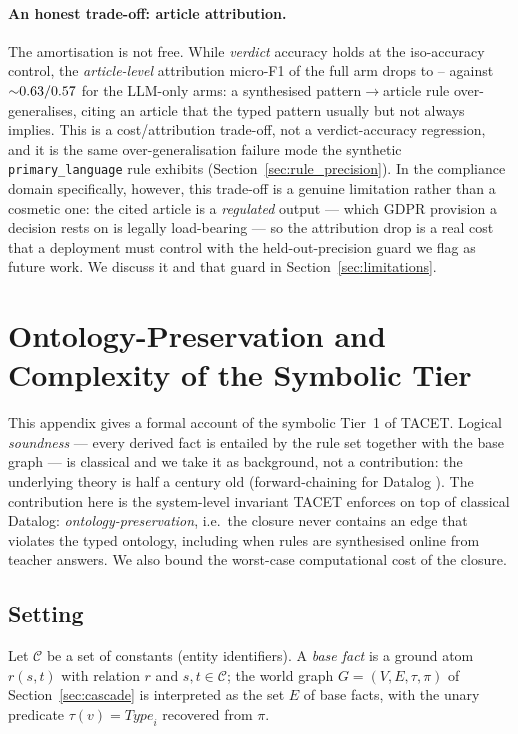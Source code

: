 \documentclass[11pt]{article}
\theoremstyle{plain}
\begin{document}
\paragraph{An honest trade-off: article attribution.} The amortisation is not
free. While \emph{verdict} accuracy holds at the iso-accuracy control, the
\emph{article-level} attribution micro-F1 of the full arm drops to
\privArtFOneFullGemini--\privArtFOneFullGrok{} against
${\sim}0.63/0.57{}$ for the LLM-only arms: a synthesised pattern$\to$article
rule over-generalises, citing an article that the typed pattern usually but not
always implies. This is a cost/attribution trade-off, not a verdict-accuracy
regression, and it is the same over-generalisation failure mode the synthetic
\texttt{primary\_language} rule exhibits (Section~\ref{sec:rule_precision}). In the
compliance domain specifically, however, this trade-off is a genuine limitation
rather than a cosmetic one: the cited article is a \emph{regulated} output ---
which GDPR provision a decision rests on is legally load-bearing --- so the
attribution drop is a real cost that a deployment must control with the
held-out-precision guard we flag as future work. We discuss it and that guard in
Section~\ref{sec:limitations}.

\section{Ontology-Preservation and Complexity of the Symbolic Tier}
\label{sec:soundness}

This appendix gives a formal account of the symbolic Tier~1 of TACET.
Logical \emph{soundness} --- every derived fact is entailed by the rule
set together with the base graph --- is classical and we take it as
background, not a contribution: the underlying theory is half a century
old (forward-chaining for Datalog \cite{abiteboul1995foundations}).  The
contribution here is the system-level invariant TACET enforces on top of
classical Datalog: \emph{ontology-preservation}, i.e.\ the closure never
contains an edge that violates the typed ontology, including when rules
are synthesised online from teacher answers.  We also bound the
worst-case computational cost of the closure.

\subsection{Setting}
\label{sec:soundness-setting}

Let $\mathcal{C}$ be a set of constants (entity identifiers).
A \emph{base fact} is a ground atom $r(s, t)$ with relation $r$ and
$s, t \in \mathcal{C}$; the world graph
$G = (V, E, \tau, \pi)$ of Section~\ref{sec:cascade} is interpreted as
the set $E$ of base facts, with the unary predicate
$\tau(v) = \mathit{Type}_i$ recovered from $\pi$.
\end{document}
